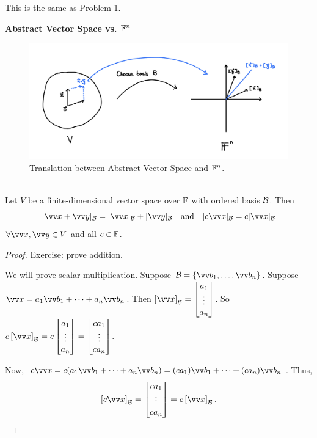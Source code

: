\begin{remark}
    This is the same as Problem 1.
\end{remark}

\textbf{Abstract Vector Space vs. ${\mathbb{F}}^n$}

\begin{figure}[htbp]
    \center
    \includegraphics[scale=0.23]{img/vector_space--Fn.jpg}
    \caption{Translation between Abstract Vector Space and ${\mathbb{F}}^n$.}
\end{figure}


\begin{theorem}
    \phantom{}\\
    Let $V$ be a finite-dimensional vector space over ${\mathbb{F}}$ with ordered basis $\mathcal{B}$. Then
    \[[\vx + \vy]_{\mB} = [\vx]_{\mB} + [\vy]_{\mB} \quad \text{and} \quad [c\vx]_{\mB} = c[\vx]_{\mB}\]
    $\forall \vx,\vy \in V$ and all $c \in {\mathbb{F}}$.
\end{theorem}

\begin{proof}
    Exercise: prove addition.

    We will prove scalar multiplication. Suppose $\mB = \left\{ \vvb_1,\ldots,\vvb_n \right\}$. Suppose $\vx = a_1\vvb_1 + \cdots + a_n\vvb_n$.
    Then $\left[ \vx \right]_{\mB} = \cv{a_1 \\ \vdots \\ a_n}$. So $c\left[ \vx \right]_{\mB} = c\cv{a_1 \\ \vdots \\ a_n} = \cv{ca_1 \\ \vdots \\ ca_n}$.
    
    Now, $c\vx = c(a_1\vvb_1 + \cdots + a_n\vvb_n) = (ca_1)\vvb_1 + \cdots + (ca_n)\vvb_n$. Thus,
    \[\left[ c\vx \right]_{\mB} = \cv{ca_1 \\ \vdots \\ ca_n} = c\left[ \vx \right]_{\mB}.\]
\end{proof}






\newpage